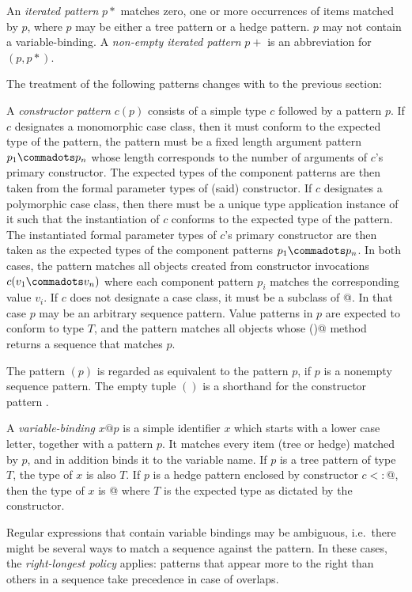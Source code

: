 {An {\em iterated pattern} $p*$ matches zero, one or more occurrences 
of items matched by $p$, where $p$ may be either a tree pattern or a hedge pattern. $p$ may not 
contain a variable-binding. A {\em non-empty iterated pattern} $p+$ is an 
abbreviation for $(p,p*)$. 

The treatment of the following patterns changes with to the 
previous section:

A {\em constructor pattern} $c(p)$ consists of a simple type $c$
followed by a pattern $p$.  If $c$ designates a monomorphic case
class, then it must conform to the expected type of the pattern, the
pattern must be a fixed length argument pattern $p_1 \commadots p_n$
whose length corresponds to the number of arguments of $c$'s primary
constructor. The expected types of the component patterns are then
taken from the formal parameter types of (said) constructor.  If $c$
designates a polymorphic case class, then there must be a unique type
application instance of it such that the instantiation of $c$ conforms
to the expected type of the pattern. The instantiated formal parameter
types of $c$'s primary constructor are then taken as the expected
types of the component patterns $p_1\commadots p_n$.  In both cases,
the pattern matches all objects created from constructor invocations
$c(v_1 \commadots v_n)$ where each component pattern $p_i$ matches the
corresponding value $v_i$. If $c$ does not designate a case class, it
must be a subclass of \lstinline@Seq[$T\,$]@. In that case $p$ may be an
arbitrary sequence pattern. Value patterns in $p$ are expected to conform to
type $T$, and the pattern matches all objects whose \lstinline@elements()@
method returns a sequence that matches $p$.

The pattern $(p)$ is regarded as equivalent to the pattern $p$, if $p$
is a nonempty sequence pattern. The empty tuple $()$ is a shorthand
for the constructor pattern .

A {\em variable-binding} $x @ p$ is a simple identifier $x$
which starts with a lower case letter, together with a pattern $p$. It
matches every item (tree or hedge) matched by $p$, and in addition binds 
it to the variable name. If $p$ is a tree pattern of type $T$, the type 
of $x$ is also $T$.
If $p$ is a hedge pattern enclosed by constructor $c <: $\lstinline@Seq[$T\,$]@,
then the type of $x$ is \lstinline@List[$T\,$]@
where $T$ is the expected type as dictated by the constructor.

%
Regular expressions that contain variable bindings may be ambiguous,
i.e.\ there might be several ways to match a sequence against the
pattern. In these cases, the \emph{right-longest policy} applies:
patterns that appear more to the right than others in a sequence take
precedence in case of overlaps.

}
